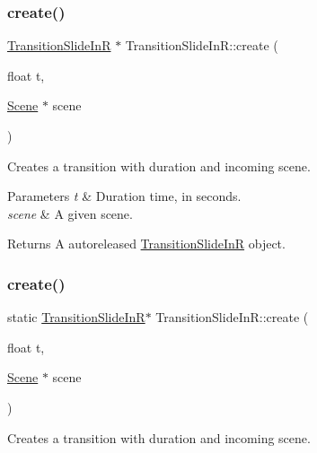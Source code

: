 \subsubsection{\texorpdfstring{create()}{create()}\hspace{0.1cm}{\footnotesize\ttfamily [1/2]}}
{\footnotesize\ttfamily \hyperlink{classTransitionSlideInR}{Transition\+Slide\+InR} $\ast$ Transition\+Slide\+In\+R\+::create (\begin{DoxyParamCaption}\item[{float}]{t,  }\item[{\hyperlink{classScene}{Scene} $\ast$}]{scene }\end{DoxyParamCaption})\hspace{0.3cm}{\ttfamily [static]}}

Creates a transition with duration and incoming scene.


\begin{DoxyParams}{Parameters}
{\em t} & Duration time, in seconds. \\
\hline
{\em scene} & A given scene. \\
\hline
\end{DoxyParams}
\begin{DoxyReturn}{Returns}
A autoreleased \hyperlink{classTransitionSlideInR}{Transition\+Slide\+InR} object. 
\end{DoxyReturn}
\mbox{\label{classTransitionSlideInR_aa6ebd02f506fbb1e947e97215ef54cec}} 
\subsubsection{\texorpdfstring{create()}{create()}\hspace{0.1cm}{\footnotesize\ttfamily [2/2]}}
{\footnotesize\ttfamily static \hyperlink{classTransitionSlideInR}{Transition\+Slide\+InR}$\ast$ Transition\+Slide\+In\+R\+::create (\begin{DoxyParamCaption}\item[{float}]{t,  }\item[{\hyperlink{classScene}{Scene} $\ast$}]{scene }\end{DoxyParamCaption})\hspace{0.3cm}{\ttfamily [static]}}

Creates a transition with duration and incoming scene.


